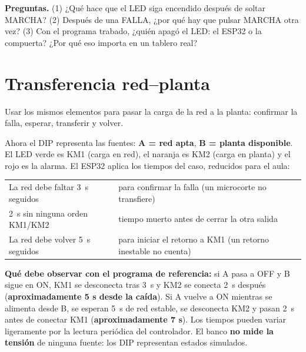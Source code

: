 \documentclass[11pt,a4paper]{article}
\begin{document}
\textbf{Preguntas.} (1) ¿Qué hace que el LED siga encendido después de soltar MARCHA? (2) Después de una FALLA, ¿por qué hay que pulsar MARCHA otra vez? (3) Con el programa trabado, ¿quién apagó el LED: el ESP32 o la compuerta? ¿Por qué eso importa en un tablero real?

\section{Transferencia red–planta}

\begin{objetivo}
Usar los mismos elementos para pasar la carga de la red a la planta: confirmar la falla, esperar, transferir y volver.
\end{objetivo}

Ahora el DIP representa las fuentes: \textbf{A = red apta}, \textbf{B = planta disponible}. El LED verde es KM1 (carga en red), el naranja es KM2 (carga en planta) y el rojo es la alarma. El ESP32 aplica los tiempos del caso, reducidos para el aula:

\begin{center}\small\renewcommand{\arraystretch}{1.2}
\begin{tabular}{@{}l l@{}}
\toprule
La red debe faltar \SI{3}{s} seguidos & para confirmar la falla (un microcorte no transfiere)\\
\SI{2}{s} sin ninguna orden KM1/KM2 & tiempo muerto antes de cerrar la otra salida\\
La red debe volver \SI{5}{s} seguidos & para iniciar el retorno a KM1 (un retorno inestable no cuenta)\\
\bottomrule
\end{tabular}
\end{center}

\begin{clave}
\textbf{Qué debe observar con el programa de referencia:} si A pasa a OFF y B sigue en ON, KM1 se desconecta tras \SI{3}{s} y KM2 se conecta \SI{2}{s} después (\textbf{aproximadamente 5 s desde la caída}). Si A vuelve a ON mientras se alimenta desde B, se esperan \SI{5}{s} de red estable, se desconecta KM2 y pasan \SI{2}{s} antes de conectar KM1 (\textbf{aproximadamente 7 s}). Los tiempos pueden variar ligeramente por la lectura periódica del controlador. El banco \textbf{no mide la tensión} de ninguna fuente: los DIP representan estados simulados.
\end{clave}
\end{document}
